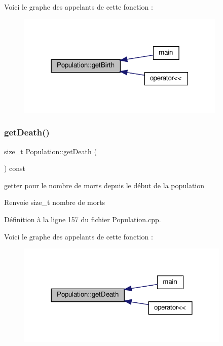 Voici le graphe des appelants de cette fonction \+:
\nopagebreak
\begin{figure}[H]
\begin{center}
\leavevmode
\includegraphics[width=282pt]{classPopulation_a703218d79e0d156a10c19e70d7433fa9_icgraph}
\end{center}
\end{figure}
\mbox{\label{classPopulation_a8cf700f7fa2dfd54035322c05bfc9914}} 
\subsubsection{\texorpdfstring{get\+Death()}{getDeath()}}
{\footnotesize\ttfamily size\+\_\+t Population\+::get\+Death (\begin{DoxyParamCaption}{ }\end{DoxyParamCaption}) const}



getter pour le nombre de morts depuis le début de la population 

\begin{DoxyReturn}{Renvoie}
size\+\_\+t nombre de morts 
\end{DoxyReturn}


Définition à la ligne 157 du fichier Population.\+cpp.

Voici le graphe des appelants de cette fonction \+:
\nopagebreak
\begin{figure}[H]
\begin{center}
\leavevmode
\includegraphics[width=288pt]{classPopulation_a8cf700f7fa2dfd54035322c05bfc9914_icgraph}
\end{center}
\end{figure}
\mbox{\label{classPopulation_aa5a0becf703f219c9e1a4270d54c397e}} 
